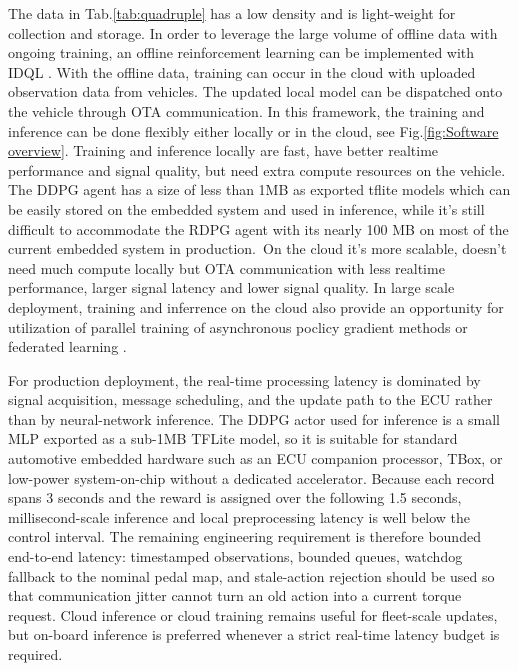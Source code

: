 \documentclass[conference]{IEEEtran}
\begin{document}
The data in Tab.\@\ref{tab:quadruple} has a low density and is light-weight for collection and storage. In order to leverage the large volume of offline data with ongoing training, an offline reinforcement learning can be implemented with IDQL \parencite{hansen-estruch23:_idql}. With the offline data, training can occur in the cloud with uploaded observation data from vehicles. The updated local model can be dispatched onto the vehicle through OTA communication. In this framework, the training and inference can be done flexibly either locally or in the cloud, see Fig.\@\ref{fig:Software overview}. Training and inference locally are fast, have better realtime performance and signal quality, but need extra compute resources on the vehicle. The DDPG agent has a size of less than 1MB as exported tflite models which can be easily stored on the embedded system and used in inference, while it's still difficult to accommodate the RDPG agent with its nearly 100 MB on most of the current embedded system in production.\ On the cloud it's more scalable, doesn't need much compute locally but OTA communication with less realtime performance, larger signal latency and lower signal quality. In large scale deployment, training and inferrence on the cloud also provide an opportunity for utilization of parallel training of asynchronous poclicy gradient methods \parencite{mnih16:_async_method_deep_reinf_learn} or federated learning \parencite{konečný15:_feder_optim}.

For production deployment, the real-time processing latency is dominated by signal acquisition, message scheduling, and the update path to the ECU rather than by neural-network inference. The DDPG actor used for inference is a small MLP exported as a sub-1MB TFLite model, so it is suitable for standard automotive embedded hardware such as an ECU companion processor, TBox, or low-power system-on-chip without a dedicated accelerator. Because each record spans 3 seconds and the reward is assigned over the following 1.5 seconds, millisecond-scale inference and local preprocessing latency is well below the control interval. The remaining engineering requirement is therefore bounded end-to-end latency: timestamped observations, bounded queues, watchdog fallback to the nominal pedal map, and stale-action rejection should be used so that communication jitter cannot turn an old action into a current torque request. Cloud inference or cloud training remains useful for fleet-scale updates, but on-board inference is preferred whenever a strict real-time latency budget is required.
\end{document}
